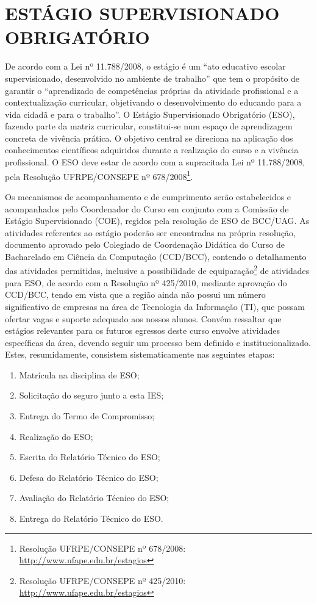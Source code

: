 \documentclass[
	12pt,				%
	openright,			%
  oneside,     %
	a4paper,			%
	chapter=TITLE,		%
	english,			%
	french,				%
	spanish,			%
	brazil				%
	]{abntex2}
\begin{document}
\chapter{ESTÁGIO SUPERVISIONADO OBRIGATÓRIO}
\label{cap_eso}

De acordo com a Lei nº 11.788/2008, o estágio é um ``ato educativo escolar supervisionado, desenvolvido no ambiente de trabalho'' que tem o propósito de garantir o “aprendizado de competências próprias da atividade profissional e a contextualização curricular, objetivando o desenvolvimento do educando para a vida cidadã e para o trabalho”. O Estágio Supervisionado Obrigatório (ESO), fazendo parte da matriz curricular, constitui-se num espaço de aprendizagem concreta de vivência prática. O objetivo central se direciona na aplicação dos conhecimentos científicos adquiridos durante a realização do curso e a vivência profissional. O ESO deve estar de acordo com a supracitada Lei nº 11.788/2008, pela Resolução UFRPE/CONSEPE nº 678/2008\footnote{Resolução UFRPE/CONSEPE nº 678/2008: \url{http://www.ufape.edu.br/estagios}}.

Os mecanismos de acompanhamento e de cumprimento serão estabelecidos e acompanhados pelo Coordenador do Curso em conjunto com a Comissão de Estágio Supervisionado (COE), regidos pela resolução de ESO de BCC/UAG. As atividades referentes ao estágio poderão ser encontradas na própria resolução, documento aprovado pelo Colegiado de Coordenação Didática do Curso de Bacharelado em Ciência da Computação (CCD/BCC), contendo o detalhamento das atividades permitidas, inclusive a possibilidade de equiparação\footnote{Resolução UFRPE/CONSEPE nº 425/2010: \url{http://www.ufape.edu.br/estagios}} de atividades para ESO, de acordo com a Resolução nº 425/2010, mediante aprovação do CCD/BCC, tendo em vista que a região ainda não possui um número significativo de empresas na área de Tecnologia da Informação (TI), que possam ofertar vagas e suporte adequado aos nossos alunos. Convém ressaltar que estágios relevantes para os futuros egressos deste curso envolve atividades específicas da área, devendo seguir um processo bem definido e institucionalizado. Estes, resumidamente, consistem sistematicamente nas seguintes etapas:

\begin{enumerate}
    \item Matrícula na disciplina de ESO;
    \item Solicitação do seguro junto a esta IES;
    \item Entrega do Termo de Compromisso;
    \item Realização do ESO;
    \item Escrita do Relatório Técnico do ESO;
    \item Defesa do Relatório Técnico do ESO;
    \item Avaliação do Relatório Técnico do ESO;
    \item Entrega do Relatório Técnico do ESO.
\end{enumerate}
\end{document}
